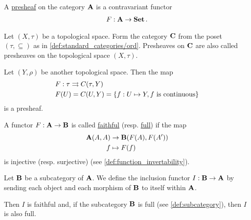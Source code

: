 \begin{definition}\label{def:presheaf}\cite[definition 1.2.15]{Leinster2014}
  A \uline{presheaf} on the category $\operatorname{\mathbf{A}}$ is a contravariant functor
  \begin{align*}
    F: \operatorname{\mathbf{A}} \to \operatorname{\mathbf{Set}}.
  \end{align*}
\end{definition}

\begin{example}\label{ex:topological_space_presheaf}\cite[24]{Leinster2014}
  Let $(X, \tau)$ be a topological space. Form the category $\operatorname{\mathbf{C}}$ from the poset $(\tau, \subseteq)$ as in \cref{def:standard_categories/ord}. Presheaves on $\operatorname{\mathbf{C}}$ are also called presheaves on the topological space $(X, \tau)$.

  Let $(Y, \rho)$ be another topological space. Then the map
  \begin{align*}
    &F: \tau \rightrightarrows C(\tau, Y) \\
    &F(U) = C(U, Y) = \{ f: U \mapsto Y, f \text{ is continuous} \}
  \end{align*}
  is a presheaf.
\end{example}

\begin{definition}\label{def:faithful_full_functors}\cite[definition 1.2.16]{Leinster2014}
  A functor $F: \operatorname{\mathbf{A}} \to \operatorname{\mathbf{B}}$ is called \uline{faithful} (resp. \uline{full}) if the map
  \begin{align*}
    \operatorname{\mathbf{A}}(A, A) &\to \operatorname{\mathbf{B}}(F(A), F(A')) \\
    f &\mapsto F(f)
  \end{align*}
  is injective (resp. surjective) (see \cref{def:function_invertability}).
\end{definition}

\begin{example}\label{def:subcategory_functors}\cite[25]{Leinster2014}
  Let $\operatorname{\mathbf{B}}$ be a subcategory of $\operatorname{\mathbf{A}}$. We define the inclusion functor $I: \operatorname{\mathbf{B}} \to \operatorname{\mathbf{A}}$ by sending each object and each morphism of $\operatorname{\mathbf{B}}$ to itself within $\operatorname{\mathbf{A}}$.

  Then $I$ is faithful and, if the subcategory $\operatorname{\mathbf{B}}$ is full (see \cref{def:subcategory}), then $I$ is also full.
\end{example}

